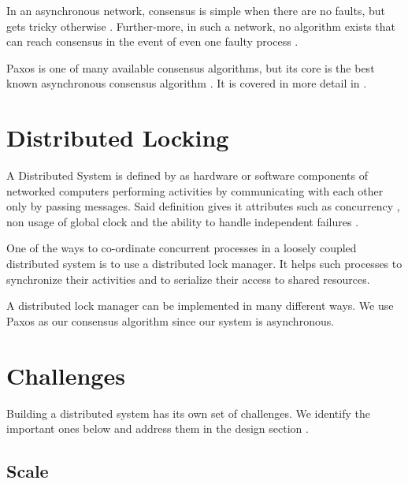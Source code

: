 In an asynchronous network, consensus is simple when there are no faults, but
gets tricky otherwise \citep{Lampson:1996:HBH}. Further-more, in such a network,
no algorithm exists that can reach consensus in the event of even one faulty process
\citep{FisLynPat85}.

Paxos is one of many available consensus algorithms, but its core is the best
known asynchronous consensus algorithm \citep{Lampson:1996:HBH}. It is covered
in more detail in .

\section{Distributed Locking}

A Distributed System is defined by \citet[]{coulouris2005distributed} as
hardware or software components of networked computers performing activities by
communicating with each other only by passing messages. Said definition gives
it attributes such as concurrency%
, non usage of global clock%
and the ability to handle independent failures
.

One of the ways to co-ordinate concurrent processes in a loosely coupled
distributed system is to use a distributed lock manager. It helps such
processes to synchronize their activities and to serialize their access to
shared resources.

A distributed lock manager can be implemented in many different ways. We use
Paxos as our consensus algorithm since our system is asynchronous.

\section{Challenges}

Building a distributed system has its own set of challenges. We identify the
important ones below and address them in the design section
.

\subsection{Scale}

